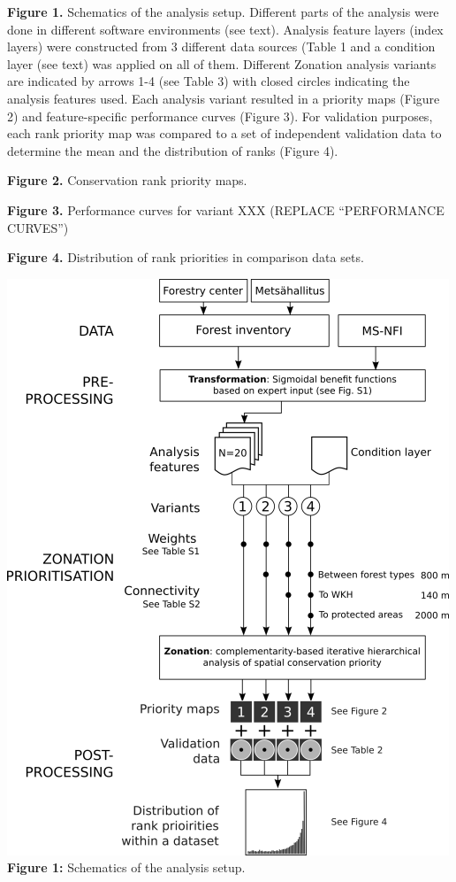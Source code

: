 \documentclass[]{article}
\begin{document}
\textbf{Figure 1.} Schematics of the analysis setup. Different parts of
the analysis were done in different software environments (see text).
Analysis feature layers (index layers) were constructed from 3 different
data sources (Table 1 and a condition layer (see text) was applied on
all of them. Different Zonation analysis variants are indicated by
arrows 1-4 (see Table 3) with closed circles indicating the analysis
features used. Each analysis variant resulted in a priority maps (Figure
2) and feature-specific performance curves (Figure 3). For validation
purposes, each rank priority map was compared to a set of independent
validation data to determine the mean and the distribution of ranks
(Figure 4).

\textbf{Figure 2.} Conservation rank priority maps.

\textbf{Figure 3.} Performance curves for variant XXX (REPLACE
``PERFORMANCE CURVES'')

\textbf{Figure 4.} Distribution of rank priorities in comparison data
sets.

\includegraphics{figs/Fig1_w500.png}\\\textbf{Figure 1:} Schematics of
the analysis setup.
\end{document}
